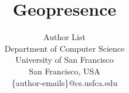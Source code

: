 \documentclass[conference]{IEEEtran}
\begin{document}
\title{Geopresence}
\author{
    Author List \\
    Department of Computer Science \\
    University of San Francisco\\
    San Francisco, USA \\
    \{author-emails\}@cs.usfca.edu
}
\maketitle

\thispagestyle{plain}
\pagestyle{plain}

%
%
%
%
%
%
%
%
%



\end{document}
